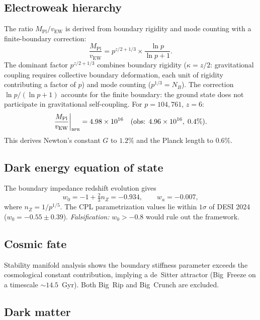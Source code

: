 \documentclass[aps,prd,twocolumn,superscriptaddress,longbibliography,nofootinbib]{revtex4-2}
\newcommand{\vEW}{v_{\mathrm{EW}}}
\newcommand{\MPl}{M_{\mathrm{Pl}}}
\newcommand{\bpr}{\textsc{bpr}}
\begin{document}
\subsection{Electroweak hierarchy}

The ratio $\MPl / \vEW$ is derived from boundary rigidity and mode counting
with a finite-boundary correction:
\begin{equation}
\frac{\MPl}{\vEW} = p^{z/2 + 1/3} \times \frac{\ln p}{\ln p + 1}.
\label{eq:hierarchy}
\end{equation}
The dominant factor $p^{z/2+1/3}$ combines boundary rigidity ($\kappa = z/2$:
gravitational coupling requires collective boundary deformation, each unit
of rigidity contributing a factor of $p$) and mode counting ($p^{1/3} = N_B$).
The correction $\ln p/(\ln p + 1)$ accounts for the finite boundary: the
ground state does not participate in gravitational self-coupling.
For $p = 104{,}761$, $z = 6$:
\begin{equation}
\frac{\MPl}{\vEW}\bigg|_{\bpr} = 4.98 \times 10^{16}
\quad (\text{obs: }4.96 \times 10^{16},\; 0.4\%).
\end{equation}
This derives Newton's constant $G$ to $1.2\%$ and the Planck length to $0.6\%$.

\subsection{Dark energy equation of state}

The boundary impedance redshift evolution gives
\begin{equation}
w_0 = -1 + \tfrac{2}{3}n_Z = -0.934, \qquad
w_a = -0.007,
\end{equation}
where $n_Z = 1/p^{1/5}$.  The CPL parametrization values lie within $1\sigma$
of DESI 2024~\cite{DESI2024} ($w_0 = -0.55 \pm 0.39$).  \textit{Falsification:}
$w_0 > -0.8$ would rule out the framework.

\subsection{Cosmic fate}

Stability manifold analysis shows the boundary stiffness parameter exceeds the
cosmological constant contribution, implying a de~Sitter attractor (Big~Freeze
on a timescale $\sim 14.5$~Gyr).  Both Big~Rip and Big~Crunch are excluded.

\subsection{Dark matter}
\end{document}
